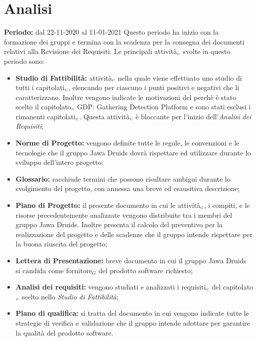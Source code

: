\section{Analisi}\label{PianificazioneAnalisi}
\textbf{Periodo:} dal 22-11-2020 al 11-01-2021
Questo periodo ha inizio con la formazione dei gruppi e termina con la scadenza per la consegna dei documenti relativi alla Revisione dei Requisiti.
Le principali attività$_{\scaleto{G}{3pt}}$ svolte in questo periodo sono:
\begin{itemize}
	\item \textbf{Studio di Fattibilità:} attività$_{\scaleto{G}{3pt}}$ nella quale viene effettuato uno studio di tutti i capitolati$_{\scaleto{G}{3pt}}$, elencando per ciascuno i punti positivi e negativi che li caratterizzano. Inoltre vengono indicate le motivazioni del perchè è stato scelto il capitolato$_{\scaleto{G}{3pt}}$ GDP: Gathering Detection Platform e sono stati esclusi i rimanenti capitolati$_{\scaleto{G}{3pt}}$.
	Questa attività$_{\scaleto{G}{3pt}}$ è bloccante per l'inizio dell'\textit{Analisi dei Requisiti};
	\item \textbf{Norme di Progetto:} vengono definite tutte le regole, le convenzioni e le tecnologie che il gruppo Jawa Druids dovrà rispettare ed utilizzare durante lo sviluppo dell'intero progetto;
	\item \textbf{Glossario:} racchiude termini che possono risultare ambigui durante lo svolgimento del progetto, con annessa una breve ed esausitiva descrizione;
	\item \textbf{Piano di Progetto:} il presente documento in cui le attività$_{\scaleto{G}{3pt}}$, i compiti, e le risorse precedentemente analizzate vengono distribuite tra i membri del gruppo Jawa Druids. Inoltre presenta il calcolo del preventivo per la realizzazione del progetto e delle scadenze che il gruppo intende rispettare per la buona riuscita del progetto;
	\item \textbf{Lettera di Presentazione:} breve documento in cui il gruppo Jawa Druids si candida come fornitore$_G$ del prodotto software richiesto;
	\item \textbf{Analisi dei requisiti:} vengono studiati e analizzati i requisiti$_{\scaleto{G}{3pt}}$ del capitolato$_{\scaleto{G}{3pt}}$ scelto nello \textit{Studio di Fattibilità};
	\item \textbf{Piano di qualifica:} si tratta del documento in cui vengono indicate tutte le strategie di verifica e validazione che il gruppo intende adottare per garantire la qualità del prodotto software.
\end{itemize}
